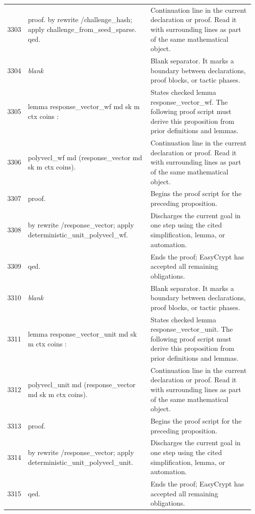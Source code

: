 \documentclass[10pt]{article}
\begin{document}
\begin{longtable}{r L{0.53\textwidth} L{0.37\textwidth}}
3303 & {\ttfamily\scriptsize proof. by rewrite /challenge\_hash; apply challenge\_from\_seed\_sparse. qed.} & Continuation line in the current declaration or proof.  Read it with surrounding lines as part of the same mathematical object. \\
3304 & {\ttfamily\scriptsize \emph{blank}} & Blank separator.  It marks a boundary between declarations, proof blocks, or tactic phases. \\
3305 & {\ttfamily\scriptsize lemma response\_vector\_wf md sk m ctx coins :} & States checked lemma response\_vector\_wf.  The following proof script must derive this proposition from prior definitions and lemmas. \\
3306 & {\ttfamily\scriptsize   polyvecl\_wf md (response\_vector md sk m ctx coins).} & Continuation line in the current declaration or proof.  Read it with surrounding lines as part of the same mathematical object. \\
3307 & {\ttfamily\scriptsize proof.} & Begins the proof script for the preceding proposition. \\
3308 & {\ttfamily\scriptsize by rewrite /response\_vector; apply deterministic\_unit\_polyvecl\_wf.} & Discharges the current goal in one step using the cited simplification, lemma, or automation. \\
3309 & {\ttfamily\scriptsize qed.} & Ends the proof; EasyCrypt has accepted all remaining obligations. \\
3310 & {\ttfamily\scriptsize \emph{blank}} & Blank separator.  It marks a boundary between declarations, proof blocks, or tactic phases. \\
3311 & {\ttfamily\scriptsize lemma response\_vector\_unit md sk m ctx coins :} & States checked lemma response\_vector\_unit.  The following proof script must derive this proposition from prior definitions and lemmas. \\
3312 & {\ttfamily\scriptsize   polyvecl\_unit md (response\_vector md sk m ctx coins).} & Continuation line in the current declaration or proof.  Read it with surrounding lines as part of the same mathematical object. \\
3313 & {\ttfamily\scriptsize proof.} & Begins the proof script for the preceding proposition. \\
3314 & {\ttfamily\scriptsize by rewrite /response\_vector; apply deterministic\_unit\_polyvecl\_unit.} & Discharges the current goal in one step using the cited simplification, lemma, or automation. \\
3315 & {\ttfamily\scriptsize qed.} & Ends the proof; EasyCrypt has accepted all remaining obligations. \\

\end{longtable}
\end{document}
